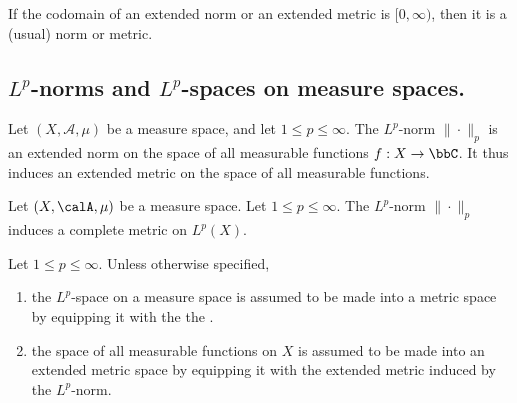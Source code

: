 % 


\begin{remark}
    If the codomain of an extended norm or an extended metric is $[0, \infty)$, then it is a (usual) norm or metric.
\end{remark}

% 




\subsection{\texorpdfstring{$L^p$}{Lp}-norms and \texorpdfstring{$L^p$}{Lp}-spaces on measure spaces.}



\begin{remark} \label{remark:space_of_measurable_functions_is_an_extended_metric_space_for_any_Lp_metric}
    Let $(X,\mathcal{A},\mu)$ be a measure space, and let $1 \leq p \leq \infty$. The $L^p$-norm $\|\cdot\|_p$ is an extended norm on the space of all measurable functions $f: X \to \bbC$. It thus induces an extended metric on the space of all measurable functions.
\end{remark}

\begin{theorem}
    Let $(X,\calA, \mu)$ be a measure space. Let $1 \leq p \leq \infty$. The $L^p$-norm $\|\cdot\|_p$ induces a complete metric on $L^p(X)$.
\end{theorem}

\begin{convention}
    Let $1 \leq p \leq \infty$. Unless otherwise specified, 
    \begin{enumerate}
        \item the $L^p$-space on a measure space is assumed to be made into a metric space by equipping it with the  the .  
        \item the space of all measurable functions on $X$ is assumed to be made into an extended metric space by equipping it with the extended metric induced by the $L^p$-norm.  
    \end{enumerate}
\end{convention}

